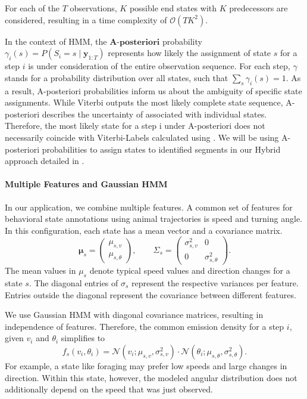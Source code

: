 For each of the $T$ observations, $K$ possible end states with $K$ predecessors are considered, resulting in a time complexity of $\mathcal{O}(TK^2)$.

In the context of HMM, the $\textbf{A-posteriori}$ probability \(\gamma_i(s)=P(S_i=s\mid\mathbf y_{1:T})\) represents how likely the assignment of state $s$ for a step $i$ is under consideration of the entire
observation sequence.
For each step, $\gamma$ stands for a probability distribution over all states, such that \(\sum_s\gamma_i(s)=1\).
As a result, A-posteriori probabilities inform us about the ambiguity of specific state assignments.
While Viterbi outputs the most likely complete state sequence, A-posteriori describes the uncertainty of associated with individual states.
Therefore, the most likely state for a step i under A-posteriori does not necessarily coincide with Viterbi-Labels calculated using .
We will be using A-posteriori probabilities to assign states to identified segments in our Hybrid approach detailed in .

\paragraph{Multiple Features and Gaussian HMM}
In our application, we combine multiple features.
A common set of features for behavioral state annotations using animal trajectories is speed and turning angle.
In this configuration, each state has a mean vector and a covariance matrix.
\[
\boldsymbol\mu_s=
\begin{pmatrix}
\mu_{s,v}\\
\mu_{s,\theta}
\end{pmatrix},
\qquad
\Sigma_s=
\begin{pmatrix}
\sigma_{s,v}^{2} & 0\\
0 & \sigma_{s,\theta}^{2}
\end{pmatrix}.
\]
The mean values in $\mu_s$ denote typical speed values and direction changes for a state $s$.
The diagonal entries of $\sigma_s$ represent the respective variances per feature.
Entries outside the diagonal represent the covariance between different features.

We use Gaussian HMM with diagonal covariance matrices, resulting in independence of features.
Therefore, the common emission density for a step $i$, given $v_i$ and $\theta_i$ simplifies to
\[
f_s(v_i,\theta_i)
=
\mathcal N(v_i;\mu_{s,v},\sigma_{s,v}^{2})
\cdot
\mathcal N(\theta_i;\mu_{s,\theta},\sigma_{s,\theta}^{2}).
\]
For example, a state like foraging may prefer low speeds and large changes in direction.
Within this state, however, the modeled angular distribution does not additionally depend on the speed that was just observed.

